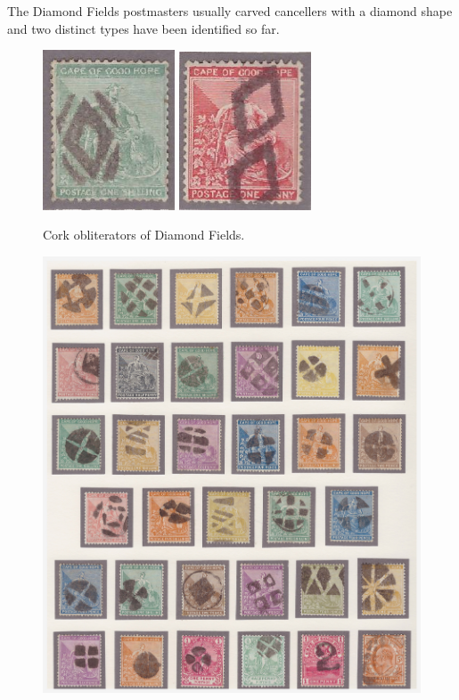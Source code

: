 The Diamond Fields postmasters usually carved cancellers with a diamond shape and two distinct types have been identified so far.

\begin{figure}
\includegraphics[width=0.35\textwidth]{../cape-of-good-hope/cork-diamond-fields.jpg}
\includegraphics[width=0.35\textwidth]{../cape-of-good-hope/cork-diamond-fields-01.jpg}
\caption{Cork obliterators of Diamond Fields.}
\label{blyskraal}
\end{figure}





\begin{figure}
\includegraphics[width=1.0\textwidth]{../cape-of-good-hope/corks.jpg}
\end{figure}

